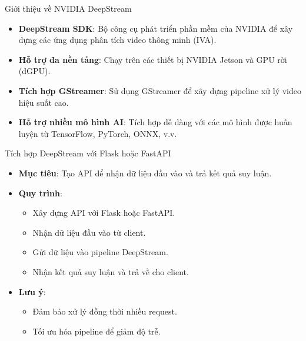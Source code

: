\documentclass{beamer}
\begin{document}
\begin{frame}{Giới thiệu về NVIDIA DeepStream}
    \begin{itemize}
        \item \textbf{DeepStream SDK}: Bộ công cụ phát triển phần mềm của NVIDIA để xây dựng các ứng dụng phân tích video thông minh (IVA).
        \item \textbf{Hỗ trợ đa nền tảng}: Chạy trên các thiết bị NVIDIA Jetson và GPU rời (dGPU).
        \item \textbf{Tích hợp GStreamer}: Sử dụng GStreamer để xây dựng pipeline xử lý video hiệu suất cao.
        \item \textbf{Hỗ trợ nhiều mô hình AI}: Tích hợp dễ dàng với các mô hình được huấn luyện từ TensorFlow, PyTorch, ONNX, v.v.
    \end{itemize}
\end{frame}

\begin{frame}{Tích hợp DeepStream với Flask hoặc FastAPI}
    \begin{itemize}
        \item \textbf{Mục tiêu}: Tạo API để nhận dữ liệu đầu vào và trả kết quả suy luận.
        \item \textbf{Quy trình}:
        \begin{itemize}
            \item Xây dựng API với Flask hoặc FastAPI.
            \item Nhận dữ liệu đầu vào từ client.
            \item Gửi dữ liệu vào pipeline DeepStream.
            \item Nhận kết quả suy luận và trả về cho client.
        \end{itemize}
        \item \textbf{Lưu ý}:
        \begin{itemize}
            \item Đảm bảo xử lý đồng thời nhiều request.
            \item Tối ưu hóa pipeline để giảm độ trễ.
        \end{itemize}
    \end{itemize}
\end{frame}
\end{document}
